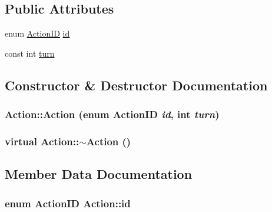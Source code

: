 \subsection*{Public Attributes}
\begin{CompactItemize}
\item 
enum \hyperlink{action_8h_3664bc98cf666c3d88d23f3fd5d9251c}{ActionID} \hyperlink{classAction_65ceb856e427411fa4eb8001880d41a8}{id}
\item 
const int \hyperlink{classAction_51e5d56a6aa4a037e90df19587a225c7}{turn}
\end{CompactItemize}


\subsection{Constructor \& Destructor Documentation}
\hypertarget{classAction_357539603b99a849c72646d1f7eb85e4}{
\subsubsection[{Action}]{\setlength{\rightskip}{0pt plus 5cm}Action::Action (enum {\bf ActionID} {\em id}, \/  int {\em turn})}}
\label{classAction_357539603b99a849c72646d1f7eb85e4}


\hypertarget{classAction_bcf4c6358f53a666631ace11b325a7cd}{
\subsubsection[{$\sim$Action}]{\setlength{\rightskip}{0pt plus 5cm}virtual Action::$\sim$Action ()}}
\label{classAction_bcf4c6358f53a666631ace11b325a7cd}




\subsection{Member Data Documentation}
\hypertarget{classAction_65ceb856e427411fa4eb8001880d41a8}{
\subsubsection[{id}]{\setlength{\rightskip}{0pt plus 5cm}enum {\bf ActionID} {\bf Action::id}}}
\label{classAction_65ceb856e427411fa4eb8001880d41a8}


